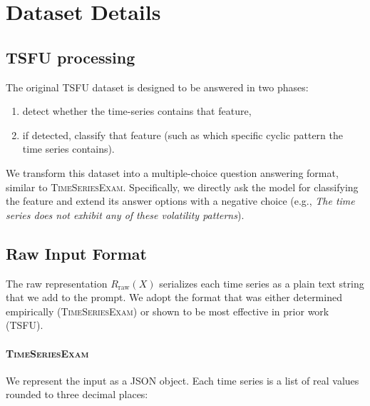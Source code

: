 \documentclass[11pt]{article}
\renewcommand{\cite}{\citep}
\begin{document}



\appendix


\section{Dataset Details}
\label{app:datasets}


\subsection{TSFU processing}
\label{app:tsfu}
The original TSFU dataset \cite{fons2024evaluatinga} is designed to be answered in two phases:

\begin{enumerate}
  \item detect whether the time-series contains that feature,
  \item if detected, classify that feature (such as which specific cyclic pattern the time series contains).
\end{enumerate}

We transform this dataset into a multiple-choice question answering format, similar to \textsc{TimeSeriesExam}. Specifically, we directly ask the model for classifying the feature and extend its answer options with a negative choice (e.g., \textit{The time series does not exhibit any of these volatility patterns}).




\subsection{Raw Input Format}

\label{app:format}

The raw representation $R_{\text{raw}}(X)$ serializes each time series as a plain text string that we add to the prompt. We adopt the format that was either determined empirically (\textsc{TimeSeriesExam}) or shown to be most effective in prior work (TSFU).

\paragraph{\textsc{TimeSeriesExam}} We represent the input as a JSON object. Each time series is a list of real values rounded to three decimal places:
\end{document}
